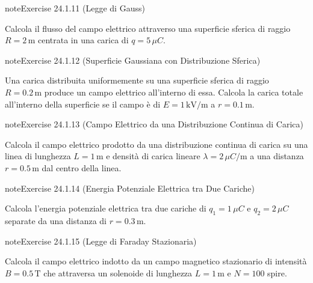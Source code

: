 \documentclass[letterpaper,10pt,italian]{jupyterBook}
\begin{document}
\begin{sphinxadmonition}{note}{Exercise 24.1.11 (Legge di Gauss)}



\sphinxAtStartPar
Calcola il flusso del campo elettrico attraverso una superficie sferica di raggio \(R = 2 \, \text{m}\) centrata in una carica di \(q = 5 \, \mu C\).
\end{sphinxadmonition}
 \label{exercise:ch/electromagnetism/electrostatics-problems-exercise-11}

\begin{sphinxadmonition}{note}{Exercise 24.1.12 (Superficie Gaussiana con Distribuzione Sferica)}



\sphinxAtStartPar
Una carica distribuita uniformemente su una superficie sferica di raggio \(R = 0.2 \, \text{m}\) produce un campo elettrico all’interno di essa. Calcola la carica totale all’interno della superficie se il campo è di \(E = 1 \, \text{kV/m}\) a \(r = 0.1 \, \text{m}\).
\end{sphinxadmonition}
 \label{exercise:ch/electromagnetism/electrostatics-problems-exercise-12}

\begin{sphinxadmonition}{note}{Exercise 24.1.13 (Campo Elettrico da una Distribuzione Continua di Carica)}



\sphinxAtStartPar
Calcola il campo elettrico prodotto da una distribuzione continua di carica su una linea di lunghezza \(L = 1 \, \text{m}\) e densità di carica lineare \(\lambda = 2 \, \mu C/\text{m}\) a una distanza \(r = 0.5 \, \text{m}\) dal centro della linea.
\end{sphinxadmonition}
 \label{exercise:ch/electromagnetism/electrostatics-problems-exercise-13}

\begin{sphinxadmonition}{note}{Exercise 24.1.14 (Energia Potenziale Elettrica tra Due Cariche)}



\sphinxAtStartPar
Calcola l’energia potenziale elettrica tra due cariche di \(q_1 = 1 \, \mu C\) e \(q_2 = 2 \, \mu C\) separate da una distanza di \(r = 0.3 \, \text{m}\).
\end{sphinxadmonition}
 \label{exercise:ch/electromagnetism/electrostatics-problems-exercise-14}

\begin{sphinxadmonition}{note}{Exercise 24.1.15 (Legge di Faraday Stazionaria)}



\sphinxAtStartPar
Calcola il campo elettrico indotto da un campo magnetico stazionario di intensità \(B = 0.5 \, \text{T}\) che attraversa un solenoide di lunghezza \(L = 1 \, \text{m}\) e \(N = 100\) spire.
\end{sphinxadmonition}
 \label{exercise:ch/electromagnetism/electrostatics-problems-exercise-15}
\end{document}
